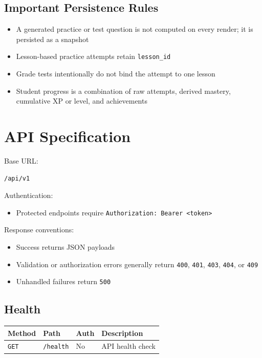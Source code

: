 \documentclass[11pt,a4paper]{article}
\newcommand{\docpath}[1]{\texttt{#1}}
\begin{document}
\subsection{Important Persistence Rules}

\begin{itemize}[leftmargin=1.5em]
  \item A generated practice or test question is not computed on every render; it is persisted as a snapshot
  \item Lesson-based practice attempts retain \docpath{lesson\_id}
  \item Grade tests intentionally do not bind the attempt to one lesson
  \item Student progress is a combination of raw attempts, derived mastery, cumulative XP or level, and achievements
\end{itemize}

\section{API Specification}

Base URL:
\begin{lstlisting}[style=doccode]
/api/v1
\end{lstlisting}

Authentication:
\begin{itemize}[leftmargin=1.5em]
  \item Protected endpoints require \docpath{Authorization: Bearer <token>}
\end{itemize}

Response conventions:
\begin{itemize}[leftmargin=1.5em]
  \item Success returns JSON payloads
  \item Validation or authorization errors generally return \docpath{400}, \docpath{401}, \docpath{403}, \docpath{404}, or \docpath{409}
  \item Unhandled failures return \docpath{500}
\end{itemize}

\subsection{Health}

\begin{longtable}{L{0.12\textwidth}L{0.25\textwidth}L{0.12\textwidth}L{0.41\textwidth}}
\toprule
\textbf{Method} & \textbf{Path} & \textbf{Auth} & \textbf{Description} \\
\midrule
\endhead
\docpath{GET} & \docpath{/health} & No & API health check \\
\bottomrule
\end{longtable}
\end{document}
